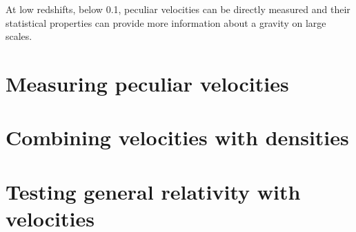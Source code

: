 \chaptertoc{}

At low redshifts, below 0.1, peculiar velocities can be directly measured
and their statistical properties can provide more information about a
gravity on large scales. 

\section{Measuring peculiar velocities}

\section{Combining velocities with densities}

\section{Testing general relativity with velocities}



